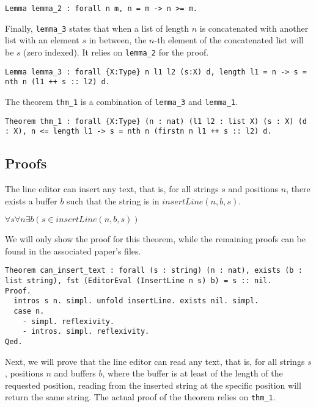 \documentclass{article}
\theoremstyle{definition}
\begin{document}
\begin{lstlisting}
Lemma lemma_2 : forall n m, n = m -> n >= m.
\end{lstlisting}

Finally, \texttt{lemma\_3} states that when a list of length \(n\) is concatenated with another list with an element \(s\) in between, the \(n\)-th element of the concatenated list will be \(s\) (zero indexed). It relies on \texttt{lemma\_2} for the proof.

\begin{lstlisting}
Lemma lemma_3 : forall {X:Type} n l1 l2 (s:X) d, length l1 = n -> s = nth n (l1 ++ s :: l2) d.
\end{lstlisting}

The theorem \texttt{thm\_1} is a combination of \texttt{lemma\_3} and \texttt{lemma\_1}.

\begin{lstlisting}
Theorem thm_1 : forall {X:Type} (n : nat) (l1 l2 : list X) (s : X) (d : X), n <= length l1 -> s = nth n (firstn n l1 ++ s :: l2) d.
\end{lstlisting}

\subsection{Proofs}

The line editor can insert any text, that is, for all strings \(s\) and positions \(n\), there exists a buffer \(b\) such that the string is in \(insertLine( n, b, s )\).

\begin{center}
\(\forall s \forall n \exists b (s \in insertLine( n, b, s ))\)
\end{center}

We will only show the proof for this theorem, while the remaining proofs can be found in the associated paper's files.

\begin{lstlisting}
Theorem can_insert_text : forall (s : string) (n : nat), exists (b : list string), fst (EditorEval (InsertLine n s) b) = s :: nil.
Proof.
  intros s n. simpl. unfold insertLine. exists nil. simpl.
  case n.
    - simpl. reflexivity.
    - intros. simpl. reflexivity.
Qed.
\end{lstlisting}

Next, we will prove that the line editor can read any text, that is, for all strings \(s\), positions \(n\) and buffers \(b\), where the buffer is at least of the length of the requested position, reading from the inserted string at the specific position will return the same string. The actual proof of the theorem relies on \texttt{thm\_1}.
\end{document}

